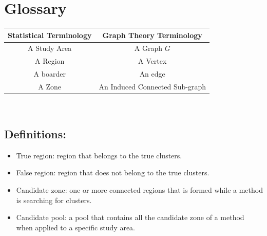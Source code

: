 \documentclass[12pt]{article}
\begin{document}
\section{Glossary}
\begin{tabular}{|c|c|}
\hline
\textbf{Statistical Terminology }& \textbf{Graph Theory Terminology} \\
\hline
A Study Area & A Graph $G$ \\
A Region & A Vertex \\
A boarder & An edge \\
A Zone & An Induced Connected Sub-graph\\

\hline

\end{tabular} \\

 	
\subsection{Definitions:} 
\begin{itemize}
\item True region:  region that belongs to the true clusters. \\ 
\item False region:  region that does not belong to the true clusters. \\ 
\item Candidate zone:  one or more connected regions that is formed while a method is searching for clusters.\\ 
\item Candidate pool:  a pool that contains all the candidate zone of a method when applied to a specific study area. \\
\end{itemize}
\end{document}
